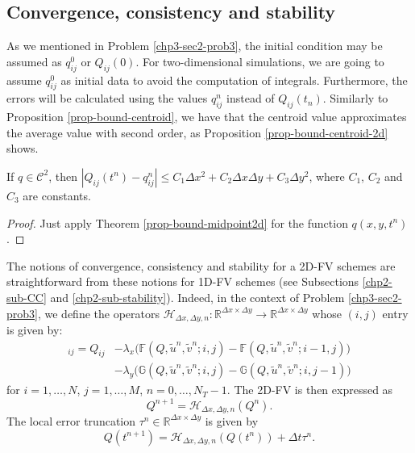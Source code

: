 \subsection{Convergence, consistency and stability}
\label{chp3-CCS}
As we mentioned in Problem \ref{chp3-sec2-prob3}, the initial condition may be assumed as $q_{ij}^0$ or $Q_{ij}(0)$. 
For two-dimensional simulations, we are going to assume  $q_{ij}^0$ as initial data to avoid the computation of integrals.
Furthermore, the errors will be calculated using the values $q_{ij}^n$ instead of $Q_{ij}(t_n)$.
Similarly to Proposition \ref{prop-bound-centroid}, we have that the centroid value approximates the average value
with second order, as Proposition \ref{prop-bound-centroid-2d} shows.
\begin{prop}
	\label{prop-bound-centroid-2d}
	If $q \in \mathcal{C}^2$, then $|Q_{ij}(t^n)-q_{ij}^n| \leq C_1 \Delta x^2 + C_2 \Delta x \Delta y + C_3 \Delta y^2$, where 
	$C_1$, $C_2$ and $C_3$ are constants.
\end{prop}
\begin{proof}
	Just apply Theorem \ref{prop-bound-midpoint2d} for the function $q(x,y,t^n)$.	
\end{proof}
The notions of convergence, consistency and stability for a 2D-FV schemes
are straightforward from these notions for 1D-FV schemes
(see Subsections \ref{chp2-sub-CC} and \ref{chp2-sub-stability}).
Indeed, in the context of Problem \ref{chp3-sec2-prob3}, we define the operators
$\mathcal{H}_{\Delta x ,\Delta y,n}: \mathbb{R}^{\Delta x \times \Delta y} \to \mathbb{R}^{\Delta x \times \Delta y}$ whose $(i,j)$ entry is given by:
\begin{align*}
	[\mathcal{H}_{\Delta x ,\Delta y,n}(Q)]_{ij} = Q_{ij} &-{\lambda_x} \bigg( \mathbb{F}(Q,\tilde{u}^n,\tilde{v}^n;i,j) - \mathbb{F}(Q,\tilde{u}^n,\tilde{v}^n;i-1,j) \bigg) \\ \nonumber
								 	   &-{\lambda_y} \bigg( \mathbb{G}(Q,\tilde{u}^n,\tilde{v}^n;i,j) - \mathbb{G}(Q,\tilde{u}^n,\tilde{v}^n;i,j-1) \bigg)
\end{align*}
for $i=1, \ldots, N$, $j=1, \ldots, M$, $n=0, \ldots, N_T-1$. The 2D-FV is then expressed as
\begin{equation*}
	Q^{n+1} = \mathcal{H}_{\Delta x ,\Delta y,n}(Q^n).
\end{equation*}
The local error truncation $\tau^n \in \mathbb{R}^{\Delta x \times \Delta y}$ is given by
\begin{equation*}
	Q(t^{n+1}) = \mathcal{H}_{\Delta x ,\Delta y,n}(Q(t^n)) + \Delta t \tau^n.
\end{equation*}
